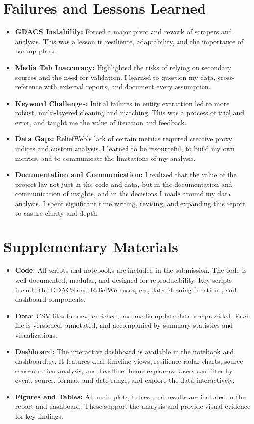 \documentclass[12pt]{article}
\begin{document}
\section{Failures and Lessons Learned}
\begin{itemize}
    \item \textbf{GDACS Instability:} Forced a major pivot and rework of scrapers and analysis. This was a lesson in resilience, adaptability, and the importance of backup plans.
    \item \textbf{Media Tab Inaccuracy:} Highlighted the risks of relying on secondary sources and the need for validation. I learned to question my data, cross-reference with external reports, and document every assumption.
    \item \textbf{Keyword Challenges:} Initial failures in entity extraction led to more robust, multi-layered cleaning and matching. This was a process of trial and error, and taught me the value of iteration and feedback.
    \item \textbf{Data Gaps:} ReliefWeb’s lack of certain metrics required creative proxy indices and custom analysis. I learned to be resourceful, to build my own metrics, and to communicate the limitations of my analysis.
    \item \textbf{Documentation and Communication:} I realized that the value of the project lay not just in the code and data, but in the documentation and communication of insights, and in the decisions I made around my data analysis. I spent significant time writing, revising, and expanding this report to ensure clarity and depth.
\end{itemize}

\section{Supplementary Materials}
\begin{itemize}
    \item \textbf{Code:} All scripts and notebooks are included in the submission. The code is well-documented, modular, and designed for reproducibility. Key scripts include the GDACS and ReliefWeb scrapers, data cleaning functions, and dashboard components.
    \item \textbf{Data:} CSV files for raw, enriched, and media update data are provided. Each file is versioned, annotated, and accompanied by summary statistics and visualizations.
    \item \textbf{Dashboard:} The interactive dashboard is available in the notebook and dashboard.py. It features dual-timeline views, resilience radar charts, source concentration analysis, and headline theme explorers. Users can filter by event, source, format, and date range, and explore the data interactively.
    \item \textbf{Figures and Tables:} All main plots, tables, and results are included in the report and dashboard. These support the analysis and provide visual evidence for key findings.
\end{itemize}
\end{document}
